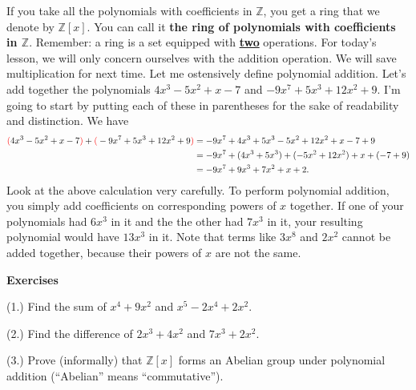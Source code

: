 \documentclass[12pt]{article}
\begin{document}
\noindent If you take all the polynomials with coefficients in $\mathbb{Z}$, you get a ring that we denote by $\mathbb{Z}[x].$ You can call it \textbf{the ring of polynomials with coefficients in $\mathbb{Z}$}. Remember: a ring is a set equipped with \underline{\textbf{two}} operations. For today's lesson, we will only concern ourselves with the addition operation. We will save multiplication for next time. Let me ostensively define polynomial addition. Let's add together the polynomials $4x^3-5x^2+x-7$ and $-9x^7+5x^3+12x^2+9$. I'm going to start by putting each of these in parentheses for the sake of readability and distinction. We have
\begin{align*}
\textcolor{red}{(}4x^3-5x^2+x-7\textcolor{red}{)} + \textcolor{red}{(}-9x^7+5x^3+12x^2+9\textcolor{red}{)} &= -9x^7 + 4x^3 + 5x^3 - 5x^2 + 12x^2 + x - 7 + 9 \\
&= -9x^7 + (4x^3 +5x^3) + (-5x^2 + 12x^2) + x + (-7 + 9) \\
&= -9x^7 + 9x^3 + 7x^2 + x + 2.
\end{align*}
\noindent Look at the above calculation very carefully. To perform polynomial addition, you simply add coefficients on corresponding powers of $x$ together. If one of your polynomials had $6x^3$ in it and the the other had $7x^3$ in it, your resulting polynomial would have $13x^3$ in it. Note that terms like $3x^8$ and $2x^2$ cannot be added together, because their powers of $x$ are not the same. 

\vspace{5mm}

\begin{center}
{\large\textbf{Exercises}}
\end{center}

\vspace{3mm}

\noindent \textcolor{blue1}{(1.)} Find the sum of $x^4+9x^2$ and $x^5 - 2x^4 + 2x^2$.

\vspace{30mm}

\noindent \textcolor{blue1}{(2.)} Find the difference of $2x^3 + 4x^2$ and $7x^3 + 2x^2$.

\vspace{30mm}

\noindent \textcolor{blue1}{(3.)} Prove (informally) that $\mathbb{Z}[x]$ forms an Abelian group under polynomial addition (``Abelian'' means ``commutative'').
\end{document}
